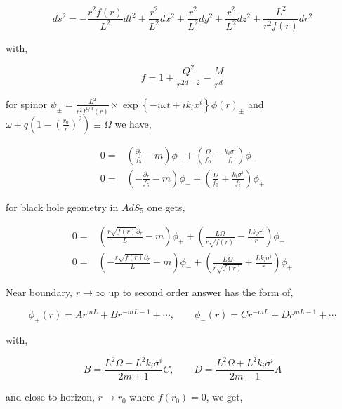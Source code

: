 \begin{equation}
   ds^2 = -\frac{r^2f(r)}{L^2}dt^2 + \frac{r^2}{L^2}dx^2 + \frac{r^2}{L^2}dy^2 + \frac{r^2}{L^2}dz^2 + \frac{L^2}{r^2f(r)}dr^2 
\end{equation}

with,

\begin{equation}
   f = 1 + \frac{Q^2}{r^{2d-2}} - \frac{M}{r^d}
\end{equation}

for spinor $\psi_{\pm} = \frac{L^2}{r^2f^{1/4}(r)}\times\exp\left\{-i\omega t +ik_ix^i\right\}\phi(r)_{\pm}$ and $\omega + q(1-(\frac{r_0}{r})^2) \equiv \Omega$  we have,

\begin{align}
    0 =& \left( \frac{\partial_r}{f_5} - m \right) \phi_{+} + \left( \frac{\Omega}{f_0} - \frac{k_i\sigma^i}{f_i} \right) \phi_{-} \nonumber\\
    0 =& \left( - \frac{\partial_r}{f_5} - m \right) \phi_{-} + \left( \frac{\Omega}{f_0} + \frac{k_i\sigma^i}{f_i} \right) \phi_{+}
\end{align}

for black hole geometry in $AdS_5$ one gets,

\begin{align} \label{eq:DiracEquationinBlackHoleAdS5}
    0 =& \left( \frac{r\sqrt{f(r)}\partial_r}{L} - m \right) \phi_{+} + \left( \frac{L\Omega}{r\sqrt{f(r)}} - \frac{Lk_i\sigma^i}{r} \right) \phi_{-} \nonumber\\
    0 =& \left(-\frac{r\sqrt{f(r)}\partial_r}{L} - m \right) \phi_{-} + \left( \frac{L\Omega}{r\sqrt{f(r)}} + \frac{Lk_i\sigma^i}{r} \right) \phi_{+}
\end{align}

Near boundary, $r\rightarrow\infty$ up to second order answer has the form of,

\begin{equation} \label{eq:NearBoundaryAdS5BlackHoleDiracEquation}
   \phi_{+}(r) = Ar^{mL} + Br^{-mL-1} + \cdots, \qquad \phi_{-}(r) = Cr^{-mL} + Dr^{mL-1} + \cdots
\end{equation}

with,

\begin{equation}
   B = \frac{L^2\Omega - L^2k_i\sigma^i}{2m + 1}C, \qquad D = \frac{L^2\Omega + L^2k_i\sigma^i}{2m-1}A
\end{equation}

and close to horizon, $r\rightarrow r_0$ where $f(r_0) = 0$, we get,

